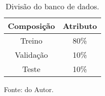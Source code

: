 



\begin{table}[H]
    \centering
    \caption{Divisão do banco de dados.}
\begin{tabular}{cc}
\hline
Composição & Atributo \\ \hline
Treino     & 80\%     \\
Validação  & 10\%     \\
Teste      & 10\%     \\ \hline
\end{tabular}

    \label{tab: DivBancoDeDados}

    \vspace{2.5mm}
    Fonte: do Autor.

\end{table}
